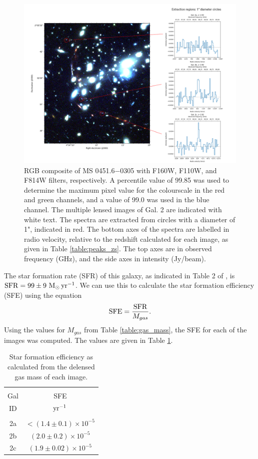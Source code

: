 \documentclass[11pt]{article}
\begin{document}
\begin{figure}[!htbp]
    \hspace{-1cm}
    \includegraphics[width=1.1\linewidth]{../figs/final.png}
	\caption{RGB composite of MS 0451.6−0305 with F160W, F110W, and F814W filters, respectively. A percentile value of 99.85 was used to determine the maximum pixel value for the colourscale in the red and green channels, and a value of 99.0 was used in the blue channel. The multiple lensed images of Gal. 2 are indicated with white text. The spectra are extracted from circles with a diameter of 1", indicated in red. The bottom axes of the spectra are labelled in radio velocity, relative to the redshift calculated for each image, as given in Table \ref{table:peaks_zs}. The top axes are in observed frequency (GHz), and the side axes in intensity (Jy/beam).}
    \label{fig:final_oteo}
\end{figure}

The star formation rate (SFR) of this galaxy, as indicated in Table 2 of \cite{MacKenzie2014}, is ${\rm SFR}=99\pm9~{\rm M_\odot\,yr^{-1}}$. We can use this to calculate the star formation efficiency (SFE) using the equation
\begin{align}
	{\rm SFE} = \frac{\rm SFR}{M_{gas}}.
\end{align}
Using the values for $M_{gas}$ from Table \ref{table:gas_mass}, the SFE for each of the images was computed. The values are given in Table \ref{table:sfe}.

\begin{table}[!htbp]
\centering
\begin{tabular}{cc}
\hline \\[-0.25cm]
Gal & SFE \\
ID  & $\rm{yr^{-1}}$ \\[0.1cm]
\hline \\[-0.25cm]
2a & $<(1.4 \pm 0.1)\times 10^{-5}$  \\
2b & $(2.0 \pm 0.2)\times 10^{-5}$   \\
2c & $(1.9 \pm 0.02)\times 10^{-5}$  \\
\hline
\end{tabular}
\caption{Star formation efficiency as calculated from the delensed gas mass of each image.}
\label{table:sfe}
\end{table}

\nocite{*}

\end{document}
